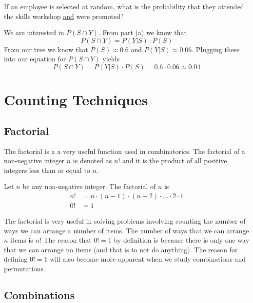 \begin{example}
\begin{benumerate}
\item If an employee is selected at random, what is the probability that they attended the skills workshop \underline{and} were promoted?

We are interested in $P(S \cap Y)$. From part (a) we know that
\[ P(S \cap Y) = P(Y|S) \cdot P(S) \]
From our tree we know that $P(S) \approx 0.6$ and $P(Y|S) \approx 0.06$. Plugging these into our equation for $P(S \cap Y)$ yields 
\[ P(S \cap Y) = P(Y|S) \cdot P(S) = 0.6 \cdot 0.06 \approx 0.04 \]
\end{benumerate}
\end{example}

\section{Counting Techniques}


\subsection{Factorial}

The factorial is a a very useful function used in combinatorics.
The factorial of a non-negative integer $n$ is denoted
as $n!$ and it is the product of all positive integers less than or equal to $n$.

\begin{definition}[Factorial (!)]
Let $n$ be any non-negative integer. The factorial of $n$ is
	\setlength{\jot}{8pt}
	\begin{align}
	n! & = n \cdot (n - 1) \cdot (n - 2) \cdot \ldots \cdot 2 \cdot 1	\\
	0! & = 1
	\end{align} 
\end{definition}

The factorial is very useful in solving problems involving counting
the number of ways we can arrange a number of items. The number of ways that we can arrange $n$ items is $n!$ The reason that $0!= 1$ by definition is because there is only one way that we can arrange no items (and that is to not do anything). The reason for defining $0!= 1$ will also become more apparent when
we study combinations and permutations.



\subsection{Combinations}


